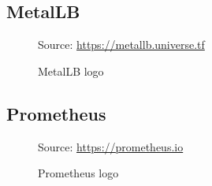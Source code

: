 \subsection{MetalLB}
\label{subsec:implementation_dependencies_metallb}

\begin{figure} %
  \centering
  \def\stackalignment{l} %
  {\scriptsize \parbox[t]{\linewidth}{ Source: \url{https://metallb.universe.tf}} }
  \caption{MetalLB logo}
\end{figure}

\subsection{Prometheus}
\label{subsec:implementation_dependencies_prometheus}

\begin{figure} %
  \centering
  \def\stackalignment{l} %
  {\scriptsize \parbox[t]{\linewidth}{ Source: \url{https://prometheus.io}} }
  \caption{Prometheus logo}
\end{figure}

